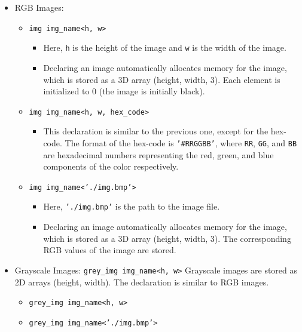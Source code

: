 \documentclass[a4paper, 11pt]{article}
\begin{document}
\begin{itemize}
        \item RGB Images: 
            \begin{itemize}
              \item \texttt{img img\_name<h, w>}
              \begin{itemize}
                \item Here, \texttt{h} is the height of the image and \texttt{w} is the width of the image.
                \item Declaring an image automatically allocates memory for the image, which is stored as a 3D array (height, width, $3$). Each element is initialized to 0 (the image is initially black).
              \end{itemize}
              \item \texttt{img img\_name<h, w, hex\_code>}
              \begin{itemize}
                \item This declaration is similar to the previous one, except for the hex-code. The format of the hex-code is \texttt{'\#RRGGBB'}, where \texttt{RR}, \texttt{GG}, and \texttt{BB} are hexadecimal numbers representing the red, green, and blue components of the color respectively.
              \end{itemize}
              \item \texttt{img img\_name<'./img.bmp'>}
              \begin{itemize}
                \item Here, \texttt{'./img.bmp'} is the path to the image file.
                \item Declaring an image automatically allocates memory for the image, which is stored as a 3D array (height, width, $3$). The corresponding RGB values of the image are stored.
              \end{itemize}
            \end{itemize}


        \item Grayscale Images: \texttt{grey\_img img\_name<h, w>}
            Grayscale images are stored as 2D arrays (height, width). The declaration is similar to RGB images.
            \begin{itemize}
              \item \texttt{grey\_img img\_name<h, w>}
              \item \texttt{grey\_img img\_name<'./img.bmp'>}
            \end{itemize}



\end{itemize}
\end{document}
